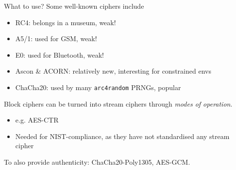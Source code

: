 \begin{frame}{What to use?}
  Some well-known ciphers include
  \begin{itemize}[<+(1)->]
    \item[\ding{55}] RC4: belongs in a museum, weak!
    \item[\ding{55}] A5/1: used for GSM, weak!
    \item[\ding{55}] E0: used for Bluetooth, weak!
    \item[\ding{51}] Ascon \& ACORN: relatively new, interesting for constrained envs
    \item[\ding{51}] ChaCha20: used by many \texttt{arc4random} PRNGs, popular
  \end{itemize}

  \vspace*{0.5em}

  \pause
  Block ciphers can be turned into stream ciphers through \emph{modes of operation}.
  \begin{itemize}[<+(1)->]
    \item e.g. AES-CTR
    \item Needed for NIST-compliance, as they have not standardised any stream cipher
  \end{itemize}

  \vspace*{0.5em}

  \pause
  To also provide authenticity: ChaCha20-Poly1305, AES-GCM.
\end{frame}


